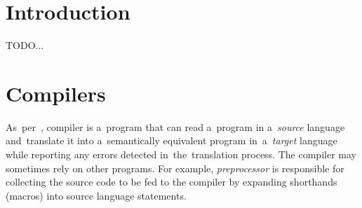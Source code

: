 \documentclass[
  digital, %
  table,   %
  lof,     %
  lot,     %
  oneside,
]{fithesis3}
\begin{document}
  \chapter{Introduction}
TODO...
%
%
%
%
%

\chapter{Compilers}
\label{chap:compilers}
As~per~\cite{dragon-book}, compiler is a~program that can read a~program in a~\textit{source} language and~translate it into a~semantically equivalent program in~a~\textit{target} language while reporting any errors detected in~the~translation process. The compiler may sometimes rely on other programs. For example, \textit{preprocessor} is responsible for collecting the source code to be fed to the compiler by expanding shorthands (macros) into source language statements. 
\end{document}
